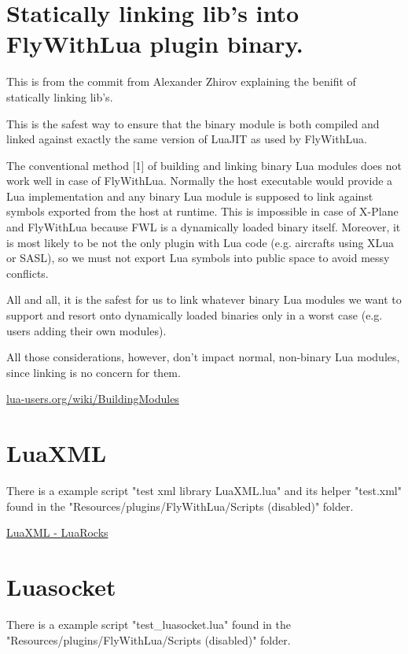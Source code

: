 \documentclass[11pt,parskip=half,a4paper]{scrartcl}
\begin{document}
\newpage

\section{Statically linking lib's into FlyWithLua plugin binary. }

This is from the commit from Alexander Zhirov explaining the benifit of statically linking lib's.

This is the safest way to ensure that the binary module is both compiled
and linked against exactly the same version of LuaJIT as used by
FlyWithLua.

The conventional method [1] of building and linking binary Lua modules
does not work well in case of FlyWithLua. Normally the host executable
would provide a Lua implementation and any binary Lua module is supposed
to link against symbols exported from the host at runtime. This is
impossible in case of X-Plane and FlyWithLua because FWL is a
dynamically loaded binary itself. Moreover, it is most likely to be not
the only plugin with Lua code (e.g. aircrafts using XLua or SASL), so we
must not export Lua symbols into public space to avoid messy conflicts.

All and all, it is the safest for us to link whatever binary Lua modules
we want to support and resort onto dynamically loaded binaries only in a
worst case (e.g. users adding their own modules).

All those considerations, however, don't impact normal, non-binary Lua
modules, since linking is no concern for them.

\href{http://lua-users.org/wiki/BuildingModules}{lua-users.org/wiki/BuildingModules}

\newpage
\section{LuaXML}

There is a example script "test xml library LuaXML.lua" and its helper "test.xml" found in the "Resources/plugins/FlyWithLua/Scripts (disabled)" folder.

\href{https://luarocks.org/modules/djerius/luaxml}{LuaXML - LuaRocks}

\section{Luasocket}

There is a example script "test\_luasocket.lua"  found in the "Resources/plugins/FlyWithLua/Scripts (disabled)" folder.
\end{document}
